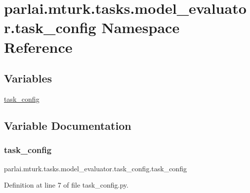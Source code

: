 \hypertarget{namespaceparlai_1_1mturk_1_1tasks_1_1model__evaluator_1_1task__config}{}\section{parlai.\+mturk.\+tasks.\+model\+\_\+evaluator.\+task\+\_\+config Namespace Reference}
\label{namespaceparlai_1_1mturk_1_1tasks_1_1model__evaluator_1_1task__config}
\subsection*{Variables}
\begin{DoxyCompactItemize}
\item 
\hyperlink{namespaceparlai_1_1mturk_1_1tasks_1_1model__evaluator_1_1task__config_a7c716835083f73ead91fee6f4166038c}{task\+\_\+config}
\end{DoxyCompactItemize}


\subsection{Variable Documentation}
\mbox{\label{namespaceparlai_1_1mturk_1_1tasks_1_1model__evaluator_1_1task__config_a7c716835083f73ead91fee6f4166038c}} 
\subsubsection{\texorpdfstring{task\+\_\+config}{task\_config}}
{\footnotesize\ttfamily parlai.\+mturk.\+tasks.\+model\+\_\+evaluator.\+task\+\_\+config.\+task\+\_\+config}



Definition at line 7 of file task\+\_\+config.\+py.

